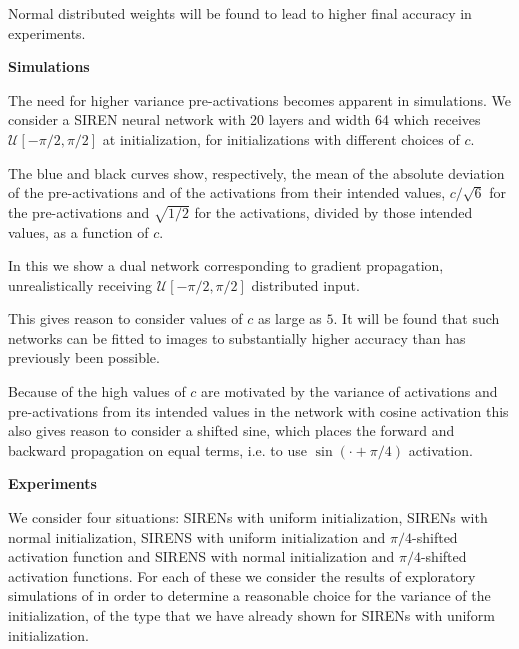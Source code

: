 \documentclass{letter}
\begin{document}
Normal distributed weights will be found to lead to higher final accuracy in experiments.

{\bf Simulations}

The need for higher variance pre-activations becomes apparent in simulations. We consider a SIREN neural network with 20 layers and width 64 which receives $\mathcal{U}[-\pi/2,\pi/2]$ at initialization, for initializations with different choices of $c$.

The blue and black curves show, respectively, the mean of the absolute deviation of the pre-activations and of the activations from their intended values, $c/\sqrt{6}$ for the pre-activations and $\sqrt{1/2}$ for the activations, divided by those intended values, as a function of $c$.

\begin{center}

\end{center}

In this we show a dual network corresponding to gradient propagation, unrealistically receiving $\mathcal{U}[-\pi/2,\pi/2]$ distributed input.

\begin{center}

\end{center}

This gives reason to consider values of $c$ as large as $5$. It will be found that such networks can be fitted to images to substantially higher accuracy than has previously been possible.

Because of the high values of $c$ are motivated by the variance of activations and pre-activations from its intended values in the network with cosine activation this also gives reason to consider a shifted sine, which places the forward and backward propagation on equal terms, i.e. to use $\sin(\cdot+\pi/4)$ activation.


{\bf Experiments}

We consider four situations: SIRENs with uniform initialization, SIRENs with normal initialization, SIRENS with uniform initialization and $\pi/4$-shifted activation function and SIRENS with normal initialization and $\pi/4$-shifted activation functions. For each of these we consider the results of exploratory simulations of in order to determine a reasonable choice for the variance of the initialization, of the type that we have already shown for SIRENs with uniform initialization.
\end{document}
